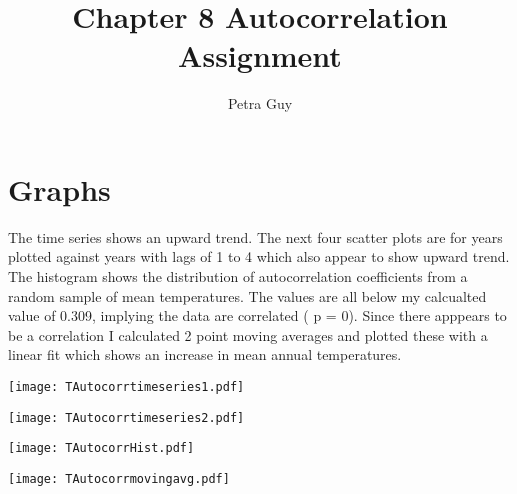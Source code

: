 \documentclass[a4paper]{article}
\title{Chapter 8 Autocorrelation Assignment}
\author{Petra Guy}
\begin{document}
\maketitle


\section{Graphs}
The time series shows an upward trend. The next four scatter plots
are for years plotted against years with lags of 1 to 4 which also appear to show 
upward trend. The histogram shows the distribution of autocorrelation coefficients
from a random sample of mean temperatures. The values are all below my calcualted value 
of 0.309, implying the data are correlated ( p = 0). Since there apppears to be
a correlation I calculated 2 point moving averages and plotted these with a linear fit
which shows an increase in mean annual temperatures.


\begin{minipage}{\linewidth}
\begin{center}
\texttt{[image: TAutocorrtimeseries1.pdf]}
\end{center}
\end{minipage}

\begin{minipage}{\linewidth}
\begin{center}
\texttt{[image: TAutocorrtimeseries2.pdf]}
\end{center}
\end{minipage}

\begin{minipage}{\linewidth}
\begin{center}
\texttt{[image: TAutocorrHist.pdf]}
\end{center}
\end{minipage}

\begin{minipage}{\linewidth}
\begin{center}
\texttt{[image: TAutocorrmovingavg.pdf]}
\end{center}
\end{minipage}
\end{document}
